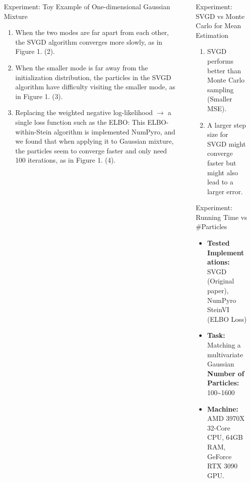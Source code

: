 \documentclass[final]{beamer}
\newlength{\sepwidth}
\newlength{\colwidth}
\newcommand{\separatorcolumn}{\begin{column}{\sepwidth}\end{column}}
\begin{document}
\begin{frame}[t]
\begin{columns}[t]
\begin{column}{\colwidth}
\begin{block}{Experiment: Toy Example of One-dimensional Gaussian Mixture}
    \begin{enumerate}
        \item When the two modes are far apart from each other, the SVGD algorithm converges more slowly, as in Figure 1. (2).
        \item When the smaller mode is far away from the initialization distribution, the particles in the SVGD algorithm have difficulty visiting the smaller mode, as in Figure 1. (3).
        \item Replacing the weighted negative log-likelihood $\rightarrow$ a single loss function such as the ELBO: This ELBO-within-Stein algorithm is implemented NumPyro, and we found that when applying it to Gaussian mixture, the particles seem to converge faster and only need 100 iterations, as in Figure 1. (4). 
    \end{enumerate}
  \end{block}
  


\end{column}

\separatorcolumn

\begin{column}{\colwidth}

    


\begin{block}{Experiment: SVGD vs Monte Carlo for Mean Estimation}
    \begin{enumerate}
    \item SVGD performs better than Monte Carlo sampling (Smaller MSE).
    \item A larger step size for SVGD might converge faster but might also lead to a larger error.
    \end{enumerate}
    
\end{block}

  \begin{block}{Experiment: Running Time vs \#Particles}

    \begin{itemize}
     \item \textbf{Tested Implementations:} SVGD (Original paper), NumPyro SteinVI (ELBO Loss)
     \item \textbf{Task:} Matching a multivariate Gaussian  \quad \textbf{Number of Particles:} 100\sim 1600
     \item \textbf{Machine:} AMD 3970X 32-Core CPU, 64GB RAM, GeForce RTX 3090 GPU.
    \end{itemize}
     
  \end{block}


\end{column}
\end{columns}
\end{frame}
\end{document}

